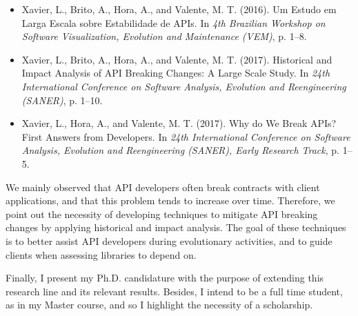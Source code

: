 \documentclass[11pt, a4paper]{article}
\begin{document}
\begin{itemize}
	\item Xavier, L., Brito, A., Hora, A., and Valente, M. T. (2016). Um Estudo em Larga Escala sobre Estabilidade de APIs. In \textit{4th Brazilian Workshop on Software Visualization, Evolution and Maintenance (VEM)}, p. 1--8.
	\item Xavier, L., Brito, A., Hora, A., and Valente, M. T. (2017). Historical and Impact Analysis of API Breaking Changes: A Large Scale Study. In \textit{24th International Conference on Software Analysis, Evolution and Reengineering (SANER)}, p. 1--10.
	\item Xavier, L., Hora, A., and Valente, M. T. (2017). Why do We Break APIs? First Answers from Developers. In \textit{24th International Conference on Software Analysis, Evolution and Reengineering (SANER), Early Research Track}, p. 1--5.
\end{itemize}

We mainly observed that API developers often break contracts with client applications, and that this problem tends to increase over time.
Therefore, we point out the necessity of developing techniques to mitigate API breaking changes by applying historical and impact analysis.
The goal of these techniques is to better assist API developers during evolutionary activities, and to guide clients when assessing libraries to depend on.

Finally, I present my Ph.D. candidature with the purpose of extending this research line and its relevant results.
Besides, I intend to be a full time student, as in my Master course, and so I highlight the necessity of a scholarship.





\end{document}
